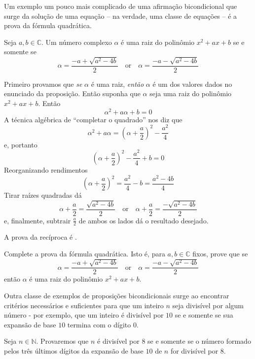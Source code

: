 \begin{estratégia}
Um exemplo um pouco mais complicado de uma afirmação bicondicional que surge da solução de uma equação – na verdade, uma classe de equações – é a prova da fórmula quadrática.

\begin{itheorem}
\label{thmQuadraticFormula}
Seja $a,b \in \mathbb{C}$. Um número complexo $\alpha$ é uma raiz do polinômio $x^2+ax+b$ se e somente se
\[
\alpha = \frac{-a+\sqrt{a^2-4b}}{2} \quad \text{or} \quad \alpha =\frac{-a-\sqrt{a^2-4b}}{2}
\]
\end{itheorem}

\begin{cproof}
Primeiro provamos que \textit{se} $\alpha$ é uma raiz, \textit{então} $\alpha$ é um dos valores dados no enunciado da proposição. Então suponha que $\alpha$ seja uma raiz do polinômio $x^2+ax+b$. Então
\[
\alpha^2 + a\alpha + b = 0
\]
A técnica algébrica de “completar o quadrado” nos diz que
\[
\alpha^2 + a\alpha = \left( \alpha + \frac{a}{2} \right)^2 - \frac{a^2}{4}
\]
e, portanto
\[
\left( \alpha + \frac{a}{2} \right)^2 - \frac{a^2}{4} + b = 0
\]
Reorganizando rendimentos
\[
\left( \alpha + \frac{a}{2} \right)^2  = \frac{a^2}{4} - b = \frac{a^2-4b}{4}
\]
Tirar raízes quadradas dá
\[
\alpha + \frac{a}{2} = \frac{\sqrt{a^2-4b}}{2} \quad \text{or} \quad \alpha + \frac{a}{2} = \frac{-\sqrt{a^2-4b}}{2}
\]
e, finalmente, subtrair $\frac{a}{2}$ de ambos os lados dá o resultado desejado.

A prova da recíproca é .
\end{cproof}

\begin{exercise}
\label{exQuadraticFormulaConverse}
Complete a prova da fórmula quadrática. Isto é, para $a,b \in \mathbb{C}$ fixos, prove que se
\[
\alpha = \frac{-a+\sqrt{a^2-4b}}{2} \quad \text{or} \quad \alpha =\frac{-a-\sqrt{a^2-4b}}{2}
\]
então $\alpha$ é uma raiz do polinômio $x^2+ax+b$.
\end{exercise}

Outra classe de exemplos de proposições bicondicionais surge ao encontrar critérios necessários e suficientes para que um inteiro $n$ seja divisível por algum número - por exemplo, que um inteiro é divisível por $10$ se e somente se sua expansão de base $10$ termina com o dígito $0$.

\begin{example}
\label{exTestForDivisibilityByEight}
Seja $n \in \mathbb{N}$. Provaremos que $n$ é divisível por $8$ se e somente se o número formado pelos três últimos dígitos da expansão de base $10$ de $n$ for divisível por $8$.


\end{example}
\end{estratégia}
